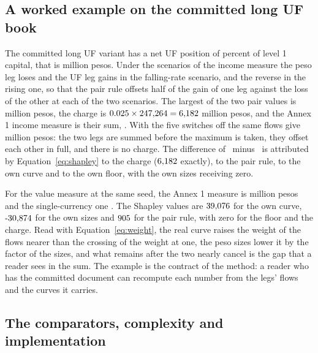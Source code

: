 \subsection{A worked example on the committed long UF book}
\label{sec:method-example}

The committed long UF variant has a net UF position of \repNuLng{} percent of level 1 capital, that is \repPnUrLng{} million pesos. Under the scenarios of the income measure the peso leg loses and the UF leg gains in the falling-rate scenario, and the reverse in the rising one, so that the pair rule offsets half of the gain of one leg against the loss of the other at each of the two scenarios. The largest of the two pair values is \repMaxPairLng{} million pesos, the charge is $0.025\times247{,}264{}=6{,}182{}$ million pesos, and the Annex 1 income measure is their sum, \repAnnexNiiLng{}. With the five switches off the same flows give \repSingleNiiLng{} million pesos: the two legs are summed before the maximum is taken, they offset each other in full, and there is no charge. The difference of \mbox{\repAnnexNiiLng{} minus \repSingleNiiLng{}} is attributed by Equation~\eqref{eq:shapley} to the charge ($6{,}182{}$ exactly), to the pair rule, to the own curve and to the own floor, with the own sizes receiving zero.

For the value measure at the same seed, the Annex 1 measure is \repAnnexEveLng{} million pesos and the single-currency one \repSingleEveLng{}. The Shapley values are $39{,}076$ for the own curve, $\caseShapSizesEveLng$ for the own sizes and $905$ for the pair rule, with zero for the floor and the charge. Read with Equation~\eqref{eq:weight}, the real curve raises the weight of the flows nearer than the crossing of the weight at one, the peso sizes lower it by the factor of the sizes, and what remains after the two nearly cancel is the gap that a reader sees in the sum. The example is the contract of the method: a reader who has the committed document can recompute each number from the legs' flows and the curves it carries.

\subsection{The comparators, complexity and implementation}
\label{sec:method-implementation}

